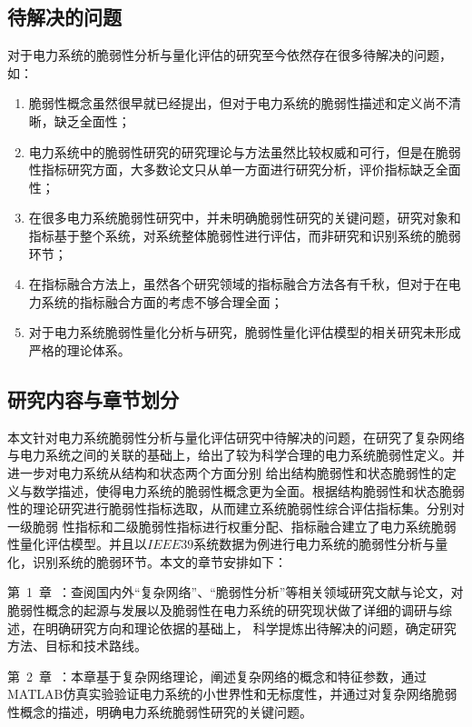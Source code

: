 \subsection{待解决的问题}
\label{sec:research_problem}
对于电力系统的脆弱性分析与量化评估的研究至今依然存在很多待解决的问题，如：
\begin{enumerate}[(1)]
  \item 脆弱性概念虽然很早就已经提出，但对于电力系统的脆弱性描述和定义尚不清晰，缺乏全面性；
  \item 电力系统中的脆弱性研究的研究理论与方法虽然比较权威和可行，但是在脆弱性指标研究方面，大多数论文只从单一方面进行研究分析，评价指标缺乏全面性；
  \item 在很多电力系统脆弱性研究中，并未明确脆弱性研究的关键问题，研究对象和指标基于整个系统，对系统整体脆弱性进行评估，而非研究和识别系统的脆弱环节；
  \item 在指标融合方法上，虽然各个研究领域的指标融合方法各有千秋，但对于在电力系统的指标融合方面的考虑不够合理全面；
  \item 对于电力系统脆弱性量化分析与研究，脆弱性量化评估模型的相关研究未形成严格的理论体系。
 \end{enumerate}

\subsection{研究内容与章节划分}
\label{sec:contendAndIdea}
本文针对电力系统脆弱性分析与量化评估研究中待解决的问题，在研究了复杂网络与电力系统之间的关联的基础上，给出了较为科学合理的电力系统脆弱性定义。并进一步对电力系统从结构和状态两个方面分别
给出结构脆弱性和状态脆弱性的定义与数学描述，使得电力系统的脆弱性概念更为全面。根据结构脆弱性和状态脆弱性的理论研究进行脆弱性指标选取，从而建立系统脆弱性综合评估指标集。分别对一级脆弱
性指标和二级脆弱性指标进行权重分配、指标融合建立了电力系统脆弱性量化评估模型。并且以$IEEE39$系统数据为例进行电力系统的脆弱性分析与量化，识别系统的脆弱环节。本文的章节安排如下：

第~1~章~：查阅国内外“复杂网络”、“脆弱性分析”等相关领域研究文献与论文，对脆弱性概念的起源与发展以及脆弱性在电力系统的研究现状做了详细的调研与综述，在明确研究方向和理论依据的基础上，
科学提炼出待解决的问题，确定研究方法、目标和技术路线。

第~2~章~：本章基于复杂网络理论，阐述复杂网络的概念和特征参数，通过MATLAB仿真实验验证电力系统的小世界性和无标度性，并通过对复杂网络脆弱性概念的描述，明确电力系统脆弱性研究的关键问题。

